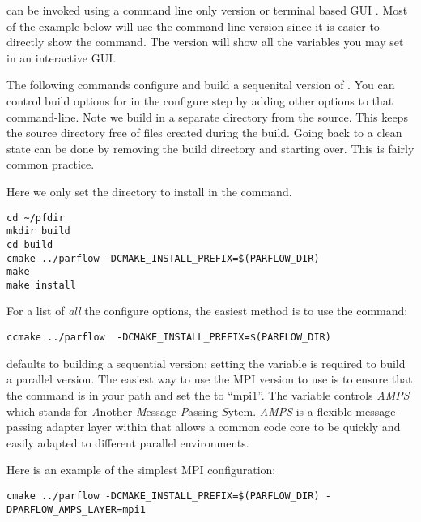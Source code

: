 \begin{enumerate}
\cmake{} can be invoked using a command line only version 
or terminal based GUI .  Most of the example below will
use the command line version since it is easier to directly show the
command.  The  version will show all the variables you
may set in an interactive GUI.

The following commands configure and build a sequenital version of
\parflow{}.  You can control build options for \parflow{} in the
\cmake{} configure step by adding other options to that command-line.
Note we build in a separate directory from the source.  This keeps the
source directory free of files created during the build.  Going back
to a clean state can be done by removing the build directory and
starting over.  This is fairly common \cmake{} practice.

Here we only set the directory to install in the \cmake{} command.

\begin{display}\begin{verbatim}
cd ~/pfdir
mkdir build
cd build
cmake ../parflow -DCMAKE_INSTALL_PREFIX=$(PARFLOW_DIR) 
make 
make install
\end{verbatim}\end{display}

For a list of \emph{all} the \cmake{} configure options, the easiest
method is to use the  command:

\begin{display}\begin{verbatim}
ccmake ../parflow  -DCMAKE_INSTALL_PREFIX=$(PARFLOW_DIR)
\end{verbatim}\end{display}

\parflow{} defaults to building a sequential version; setting the
 variable is required to build a parallel
version.  The easiest way to use the MPI version to use is to ensure
that the  command is in your path and set the
 to ``mpi1''.  The 
variable controls \emph{AMPS} which stands for \emph{A}nother
\emph{M}essage \emph{P}assing \emph{S}ytem.  \emph{AMPS} is a flexible
message-passing adapter layer within \parflow{} that allows a common
code core to be quickly and easily adapted to different parallel
environments.

Here is an example of the simplest MPI configuration:

\begin{display}\begin{verbatim}
cmake ../parflow -DCMAKE_INSTALL_PREFIX=$(PARFLOW_DIR) -DPARFLOW_AMPS_LAYER=mpi1
\end{verbatim}\end{display}


\end{enumerate}
